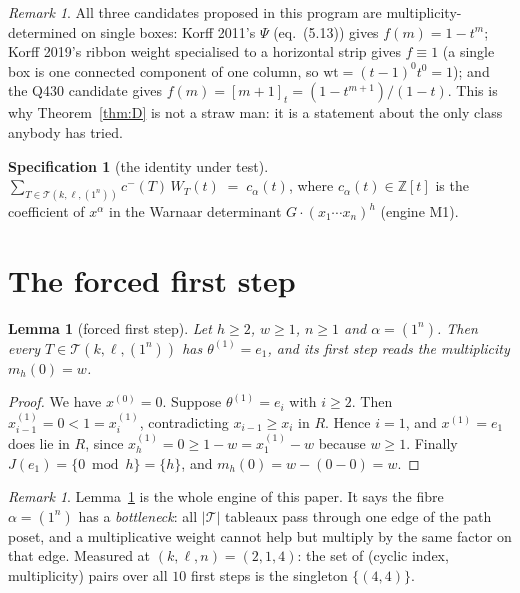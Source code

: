 \documentclass[11pt]{article}
\theoremstyle{plain}
\newtheorem{lemma}[theorem]{Lemma}
\theoremstyle{definition}
\newtheorem{specification}[theorem]{Specification}
\theoremstyle{remark}
\newtheorem{remark}[theorem]{Remark}
\newcommand{\cm}{c^{-}}
\newcommand{\qbin}[1]{[#1]_t}
\begin{document}
\begin{remark}
All three candidates proposed in this program are multiplicity-determined on single boxes:
Korff 2011's $\Psi$ (eq.\ (5.13)) gives $f(m)=1-t^m$; Korff 2019's ribbon weight
specialised to a horizontal strip gives $f\equiv1$ (a single box is one connected
component of one column, so $\mathrm{wt}=(t-1)^{0}t^{0}=1$); and the Q430 candidate gives
$f(m)=\qbin{m+1}=(1-t^{m+1})/(1-t)$. This is why Theorem~\ref{thm:D} is not a straw man:
it is a statement about the only class anybody has tried.
\end{remark}

\begin{specification}[the identity under test]\label{spec}
$\displaystyle \sum_{T\in\mathcal{T}(k,\ell,(1^n))}\cm(T)\,W_T(t)\;=\;c_\alpha(t)$,
where $c_\alpha(t)\in\mathbb{Z}[t]$ is the coefficient of $x^{\alpha}$ in the Warnaar
determinant $G\cdot(x_1\cdots x_n)^{h}$ (engine M1).
\end{specification}

\section{The forced first step}

\begin{lemma}[forced first step]\label{lem:A}
Let $h\geq2$, $w\geq1$, $n\geq1$ and $\alpha=(1^n)$. Then every
$T\in\mathcal{T}(k,\ell,(1^n))$ has $\theta^{(1)}=e_1$, and its first step reads the
multiplicity $m_h(0)=w$.
\end{lemma}

\begin{proof}
We have $x^{(0)}=0$. Suppose $\theta^{(1)}=e_i$ with $i\geq2$. Then
$x^{(1)}_{i-1}=0<1=x^{(1)}_{i}$, contradicting $x_{i-1}\geq x_i$ in $R$. Hence $i=1$, and
$x^{(1)}=e_1$ does lie in $R$, since $x^{(1)}_h=0\geq 1-w=x^{(1)}_1-w$ because $w\geq1$.
Finally $J(e_1)=\{0\bmod h\}=\{h\}$, and $m_h(0)=w-(0-0)=w$.
\end{proof}

\begin{remark}
Lemma~\ref{lem:A} is the whole engine of this paper. It says the fibre $\alpha=(1^n)$ has a
\emph{bottleneck}: all $|\mathcal{T}|$ tableaux pass through one edge of the path poset,
and a multiplicative weight cannot help but multiply by the same factor on that edge.
Measured at $(k,\ell,n)=(2,1,4)$: the set of (cyclic index, multiplicity) pairs over all
$10$ first steps is the singleton $\{(4,4)\}$.
\end{remark}
\end{document}
